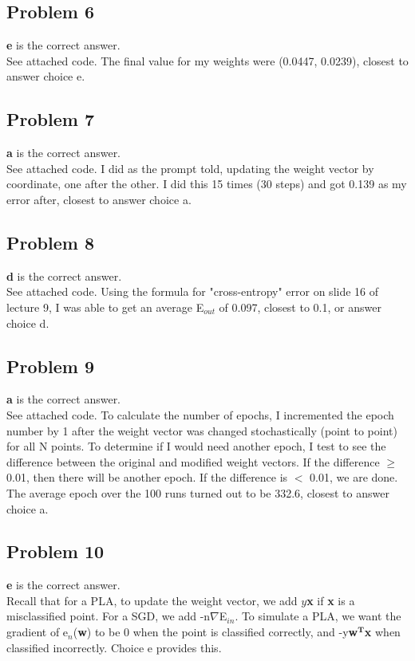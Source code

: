 \documentclass[12 pt]{article}
\begin{document}
		
	\subsection*{Problem 6}
	\textbf{e} is the correct answer. \\
	See attached code. The final value for my weights were (0.0447, 0.0239), closest to answer choice e.

		
	\subsection*{Problem 7}
	\textbf{a} is the correct answer. \\
	See attached code. I did as the prompt told, updating the weight vector by coordinate, one after the other. I did this 15 times (30 steps) and got 0.139 as my error after, closest to answer choice a.

		
	
	\subsection*{Problem 8}
	\textbf{d} is the correct answer. \\
	See attached code. Using the formula for "cross-entropy" error on slide 16 of lecture 9, I was able to get an average E$_{out}$ of 0.097, closest to 0.1, or answer choice d.
	

	
	\subsection*{Problem 9}
	\textbf{a} is the correct answer. \\
	See attached code. To calculate the number of epochs, I incremented the epoch number by 1 after the weight vector was changed stochastically (point to point) for all N points. To determine if I would need another epoch, I test to see the difference between the original and modified weight vectors. If the difference $\geq$ 0.01, then there will be another epoch. If the difference is $<$ 0.01, we are done. The average epoch over the 100 runs turned out to be 332.6, closest to answer choice a.
	
	\subsection*{Problem 10}
	\textbf{e} is the correct answer. \\
	Recall that for a PLA, to update the weight vector, we add $y$\textbf{x} if \textbf{x} is a misclassified point. For a SGD, we add -n$\nabla$E$_{in}$. To simulate a PLA, we want the gradient of e$_n$(\textbf{w}) to be 0 when the point is classified correctly, and -y\textbf{w}$^\textbf{T}$\textbf{x} when classified incorrectly. Choice e provides this. 

	
\end{document}
